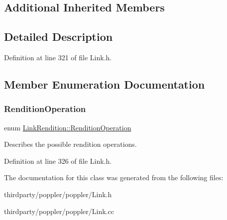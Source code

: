 \subsection*{Additional Inherited Members}


\subsection{Detailed Description}


Definition at line 321 of file Link.\+h.



\subsection{Member Enumeration Documentation}
\mbox{\label{class_link_rendition_ab30486eefee99cd4ee5c9d95ad591f5e}} 
\subsubsection{\texorpdfstring{Rendition\+Operation}{RenditionOperation}}
{\footnotesize\ttfamily enum \hyperlink{class_link_rendition_ab30486eefee99cd4ee5c9d95ad591f5e}{Link\+Rendition\+::\+Rendition\+Operation}}

Describes the possible rendition operations. 

Definition at line 326 of file Link.\+h.



The documentation for this class was generated from the following files\+:\begin{DoxyCompactItemize}
\item 
thirdparty/poppler/poppler/Link.\+h\item 
thirdparty/poppler/poppler/Link.\+cc\end{DoxyCompactItemize}
